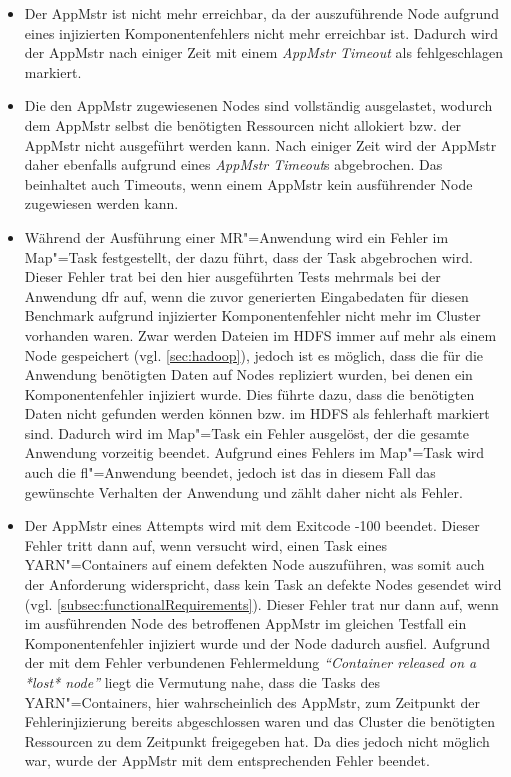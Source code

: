 \begin{itemize}
    \item
        Der \gls{AppMstr} ist nicht mehr erreichbar, da der auszuführende Node aufgrund eines injizierten Komponentenfehlers nicht mehr erreichbar ist.
        Dadurch wird der \gls{AppMstr} nach einiger Zeit mit einem \emph{\gls{AppMstr} Timeout} als fehlgeschlagen markiert.
    \item
        Die den \gls{AppMstr} zugewiesenen Nodes sind vollständig ausgelastet, wodurch dem \gls{AppMstr} selbst die benötigten Ressourcen nicht allokiert bzw. der \gls{AppMstr} nicht ausgeführt werden kann.
        Nach einiger Zeit wird der \gls{AppMstr} daher ebenfalls aufgrund eines \emph{\gls{AppMstr} Timeout}s abgebrochen.
        Das beinhaltet auch Timeouts, wenn einem \gls{AppMstr} kein ausführender Node zugewiesen werden kann.
    \item
        Während der Ausführung einer \gls{MR}"=Anwendung wird ein Fehler im Map"=Task festgestellt, der dazu führt, dass der Task abgebrochen wird.
        Dieser Fehler trat bei den hier ausgeführten Tests mehrmals bei der Anwendung \acrlong{dfr} auf, wenn die zuvor generierten Eingabedaten für diesen Benchmark aufgrund injizierter Komponentenfehler nicht mehr im Cluster vorhanden waren.
        Zwar werden Dateien im HDFS immer auf mehr als einem Node gespeichert (vgl. \cref{sec:hadoop}), jedoch ist es möglich, dass die für die Anwendung benötigten Daten auf Nodes repliziert wurden, bei denen ein Komponentenfehler injiziert wurde.
        Dies führte dazu, dass die benötigten Daten nicht gefunden werden können bzw. im HDFS als fehlerhaft markiert sind.
        Dadurch wird im Map"=Task ein Fehler ausgelöst, der die gesamte Anwendung vorzeitig beendet.
        Aufgrund eines Fehlers im Map"=Task wird auch die \acrlong{fl}"=Anwendung beendet, jedoch ist das in diesem Fall das gewünschte Verhalten der Anwendung und zählt daher nicht als Fehler.
    \item
        Der \gls{AppMstr} eines Attempts wird mit dem Exitcode -100 beendet.
        Dieser Fehler tritt dann auf, wenn versucht wird, einen Task eines YARN"=Containers auf einem defekten Node auszuführen, was somit auch der Anforderung widerspricht, dass kein Task an defekte Nodes gesendet wird (vgl. \cref{subsec:functionalRequirements}).
        Dieser Fehler trat nur dann auf, wenn im ausführenden Node des betroffenen \gls{AppMstr} im gleichen Testfall ein Komponentenfehler injiziert wurde und der Node dadurch ausfiel.
        Aufgrund der mit dem Fehler verbundenen Fehlermeldung \emph{\enquote{Container released on a *lost* node}} liegt die Vermutung nahe, dass die Tasks des YARN"=Containers, hier wahrscheinlich des \gls{AppMstr}, zum Zeitpunkt der Fehlerinjizierung bereits abgeschlossen waren und das Cluster die benötigten Ressourcen zu dem Zeitpunkt freigegeben hat.
        Da dies jedoch nicht möglich war, wurde der \gls{AppMstr} mit dem entsprechenden Fehler beendet.
\end{itemize}

